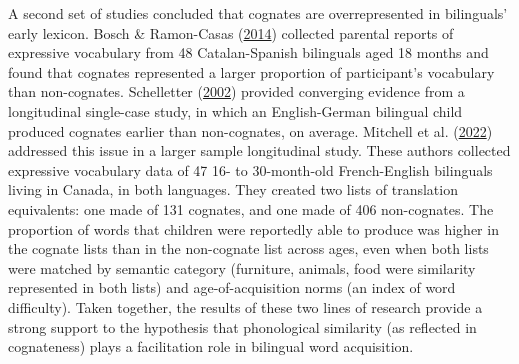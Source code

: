 \documentclass[
]{article}
\begin{document}
A second set of studies concluded that cognates are overrepresented in
bilinguals' early lexicon. Bosch \& Ramon-Casas
(\protect\hyperlink{ref-bosch2014first}{2014}) collected parental
reports of expressive vocabulary from 48 Catalan-Spanish bilinguals aged
18 months and found that cognates represented a larger proportion of
participant's vocabulary than non-cognates. Schelletter
(\protect\hyperlink{ref-schelletter2002effect}{2002}) provided
converging evidence from a longitudinal single-case study, in which an
English-German bilingual child produced cognates earlier than
non-cognates, on average. Mitchell et al.
(\protect\hyperlink{ref-mitchell2022cognates}{2022}) addressed this
issue in a larger sample longitudinal study. These authors collected
expressive vocabulary data of 47 16- to 30-month-old French-English
bilinguals living in Canada, in both languages. They created two lists
of translation equivalents: one made of 131 cognates, and one made of
406 non-cognates. The proportion of words that children were reportedly
able to produce was higher in the cognate lists than in the non-cognate
list across ages, even when both lists were matched by semantic category
(furniture, animals, food were similarity represented in both lists) and
age-of-acquisition norms (an index of word difficulty). Taken together,
the results of these two lines of research provide a strong support to
the hypothesis that phonological similarity (as reflected in
cognateness) plays a facilitation role in bilingual word acquisition.
\end{document}
